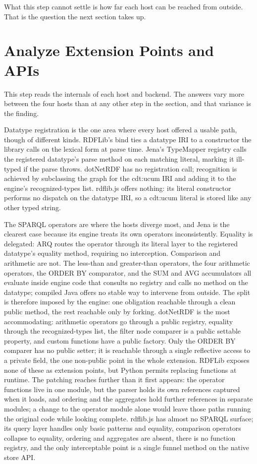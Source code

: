 What this step cannot settle is how far each host can be reached from outside. That is the question the next section takes up.


\section{Analyze Extension Points and APIs}

This step reads the internals of each host and backend. The answers vary more between the four hosts than at any other step in the section, and that variance is the finding.

Datatype registration is the one area where every host offered a usable path, though of different kinds. RDFLib's bind ties a datatype IRI to a constructor the library calls on the lexical form at parse time. Jena's TypeMapper registry calls the registered datatype's parse method on each matching literal, marking it ill-typed if the parse throws. dotNetRDF has no registration call; recognition is achieved by subclassing the graph for the cdt:ucum IRI and adding it to the engine's recognized-types list. rdflib.js offers nothing: its literal constructor performs no dispatch on the datatype IRI, so a cdt:ucum literal is stored like any other typed string.

The SPARQL operators are where the hosts diverge most, and Jena is the clearest case because its engine treats its own operators inconsistently. Equality is delegated: ARQ routes the operator through its literal layer to the registered datatype's equality method, requiring no interception. Comparison and arithmetic are not. The less-than and greater-than operators, the four arithmetic operators, the ORDER BY comparator, and the SUM and AVG accumulators all evaluate inside engine code that consults no registry and calls no method on the datatype; compiled Java offers no stable way to intervene from outside. The split is therefore imposed by the engine: one obligation reachable through a clean public method, the rest reachable only by forking.
dotNetRDF is the most accommodating: arithmetic operators go through a public registry, equality through the recognized-types list, the filter node comparer is a public settable property, and custom functions have a public factory. Only the ORDER BY comparer has no public setter; it is reachable through a single reflective access to a private field, the one non-public point in the whole extension. RDFLib exposes none of these as extension points, but Python permits replacing functions at runtime. The patching reaches further than it first appears: the operator functions live in one module, but the parser holds its own references captured when it loads, and ordering and the aggregates hold further references in separate modules; a change to the operator module alone would leave those paths running the original code while looking complete. rdflib.js has almost no SPARQL surface; its query layer handles only basic patterns and equality, comparison operators collapse to equality, ordering and aggregates are absent, there is no function registry, and the only interceptable point is a single funnel method on the native store API.

